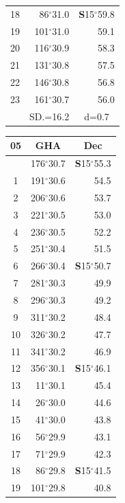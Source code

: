 \documentclass[10pt, a4paper]{report}
\begin{document}
\begin{scriptsize}
\begin{tabular*}{0.2\textwidth}[t]{@{\extracolsep{\fill}}|c|rr|}
18 & 86$^\circ$31.0 & \textbf{S}15$^\circ$59.8\\
19 & 101$^\circ$31.0 & 59.1\\
20 & 116$^\circ$30.9 & 58.3\\
21 & 131$^\circ$30.8 & \raisebox{0.24ex}{\boldmath$\cdot$~\boldmath$\cdot$~~}57.5\\
22 & 146$^\circ$30.8 & 56.8\\
23 & 161$^\circ$30.7 & 56.0\\
\hline
\rule{0pt}{2.4ex} & \multicolumn{1}{c}{SD.=16.2} & \multicolumn{1}{c|}{d=0.7}\\
\hline
\end{tabular*}\noindent
\begin{tabular*}{0.2\textwidth}[t]{@{\extracolsep{\fill}}|c|rr|}
\hline
\multicolumn{1}{|c|}{\rule{0pt}{2.6ex}\textbf{05}} & \multicolumn{1}{c}{\textbf{GHA}} & \multicolumn{1}{c|}{\textbf{Dec}}\\
\hline\rule{0pt}{2.6ex}\noindent
0 & 176$^\circ$30.7 & \textbf{S}15$^\circ$55.3\\
1 & 191$^\circ$30.6 & 54.5\\
2 & 206$^\circ$30.6 & 53.7\\
3 & 221$^\circ$30.5 & \raisebox{0.24ex}{\boldmath$\cdot$~\boldmath$\cdot$~~}53.0\\
4 & 236$^\circ$30.5 & 52.2\\
5 & 251$^\circ$30.4 & 51.5\\[2Pt]
6 & 266$^\circ$30.4 & \textbf{S}15$^\circ$50.7\\
7 & 281$^\circ$30.3 & 49.9\\
8 & 296$^\circ$30.3 & 49.2\\
9 & 311$^\circ$30.2 & \raisebox{0.24ex}{\boldmath$\cdot$~\boldmath$\cdot$~~}48.4\\
10 & 326$^\circ$30.2 & 47.7\\
11 & 341$^\circ$30.2 & 46.9\\[2Pt]
12 & 356$^\circ$30.1 & \textbf{S}15$^\circ$46.1\\
13 & 11$^\circ$30.1 & 45.4\\
14 & 26$^\circ$30.0 & 44.6\\
15 & 41$^\circ$30.0 & \raisebox{0.24ex}{\boldmath$\cdot$~\boldmath$\cdot$~~}43.8\\
16 & 56$^\circ$29.9 & 43.1\\
17 & 71$^\circ$29.9 & 42.3\\[2Pt]
18 & 86$^\circ$29.8 & \textbf{S}15$^\circ$41.5\\
19 & 101$^\circ$29.8 & 40.8\\

\end{tabular*}
\end{scriptsize}
\end{document}
